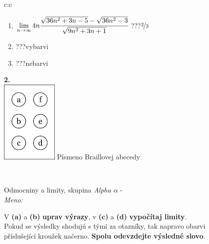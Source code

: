 \documentclass[10pt]{report}
\begin{document}
\begin{tabular}{c:c}
\begin{minipage}[c][104.5mm][t]{0.5\linewidth}
\begin{center}
\begin{minipage}{0.79\linewidth}
\begin{center}
\begin{varwidth}{\linewidth}
\begin{enumerate}
\item $\lim\limits_{n\to\infty}4n\cfrac{\sqrt{36n^2+3n-5}-\sqrt{36n^2-3}}{\sqrt{9n^2+3n+1}}$\quad \dotfill\; ???\;\dotfill \quad $\nicefrac{2}{3}$
\item \quad \dotfill\; ???\;\dotfill \quad vybarvi
\item \quad \dotfill\; ???\;\dotfill \quad nebarvi
\end{enumerate}
\end{varwidth}
\end{center}
\end{minipage}
\begin{minipage}{0.20\linewidth}
\begin{center}
{\Huge\bfseries 2.} \\[2mm]
\includegraphics[height=40mm]{../images/braille.png}
{\small Písmeno Braillovej abecedy}
\end{center}
\end{minipage}
\end{center}
\end{minipage}
\\ \hdashline
\begin{minipage}[c][104.5mm][t]{0.5\linewidth}
\begin{center}
\vspace{7mm}
{\huge Odmocniny a limity, skupina \textit{Alpha $\alpha$} -}\\[5mm]
\textit{Meno:}\phantom{xxxxxxxxxxxxxxxxxxxxxxxxxxxxxxxxxxxxxxxxxxxxxxxxxxxxxxxxxxxxxxxxx}\\[5mm]
\begin{minipage}{0.95\linewidth}
\begin{center}
V \textbf{(a)} a \textbf{(b)} \textbf{uprav výrazy}, v \textbf{(c)} a \textbf{(d)} \textbf{vypočítaj limity}.\\Pokud se výsledky shodujú s tými za otazníky, tak napravo obarvi\\příslušející kroužek načerno. \textbf{Spolu odevzdejte výsledné slovo}.
\end{center}
\end{minipage}
\\[1mm]

\end{center}
\end{minipage}
\end{tabular}
\end{document}
